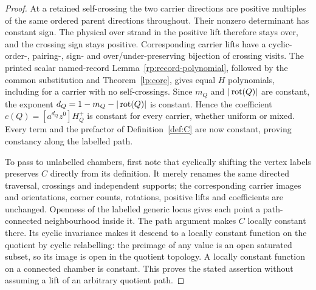 \begin{proof}
At a retained self-crossing the two carrier directions are positive
multiples of the same ordered parent directions throughout. Their
nonzero determinant has constant sign. The physical over strand in the
positive lift therefore stays over, and the crossing sign stays positive.
Corresponding carrier lifts have a cyclic-order-, pairing-, sign- and
over/under-preserving bijection of crossing visits. The printed
scalar named-record Lemma~\ref{rp:record-polynomial}, followed by the
common substitution and Theorem~\ref{lp:core}, gives equal $H$ polynomials,
including for a carrier with no self-crossings.
Since $m_Q$ and $|\operatorname{rot}(Q)|$ are constant, the exponent
$d_Q=1-m_Q-|\operatorname{rot}(Q)|$ is constant. Hence the coefficient
$c(Q)=[a^{d_Q}z^0]H_Q^+$ is constant for every carrier, whether uniform
or mixed. Every term and the prefactor of Definition~\ref{def:C} are
now constant, proving constancy along the labelled path.

To pass to unlabelled chambers, first note that cyclically shifting the
vertex labels preserves $C$ directly from its definition. It merely
renames the same directed traversal, crossings and independent supports;
the corresponding carrier images and orientations, corner counts,
rotations, positive lifts and coefficients are unchanged. Openness of the
labelled generic locus gives each point a path-connected neighbourhood
inside it. The path argument makes $C$ locally constant there. Its
cyclic invariance makes it descend to a locally constant function on the
quotient by cyclic relabelling: the preimage of any value is an open
saturated subset, so its image is open in the quotient topology. A
locally constant function on a connected chamber is constant. This proves
the stated assertion without assuming a lift of an arbitrary quotient path.
\end{proof}


